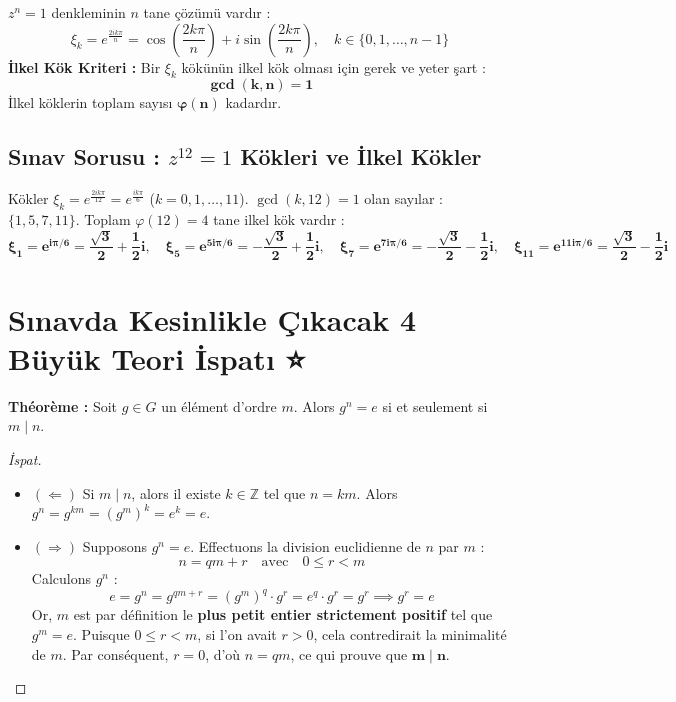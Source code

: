 \documentclass[11pt,a4paper]{article}
\begin{document}
\begin{tcolorbox}[colback=blue!5!white,colframe=blue!75!black,title=Birimin Kökleri ve İlkel Kök Şartı]
$z^n = 1$ denkleminin $n$ tane çözümü vardır :
\[ \xi_k = e^{\frac{2ik\pi}{n}} = \cos\left(\frac{2k\pi}{n}\right) + i \sin\left(\frac{2k\pi}{n}\right), \quad k \in \{0, 1, \dots, n-1\} \]
\textbf{İlkel Kök Kriteri :} Bir $\xi_k$ kökünün ilkel kök olması için gerek ve yeter şart :
\[ \mathbf{\gcd(k, n) = 1} \]
İlkel köklerin toplam sayısı $\mathbf{\varphi(n)}$ kadardır.
\end{tcolorbox}

\subsection*{Sınav Sorusu : $z^{12} = 1$ Kökleri ve İlkel Kökler}
Kökler $\xi_k = e^{\frac{2ik\pi}{12}} = e^{\frac{ik\pi}{6}}$ ($k = 0, 1, \dots, 11$).  
$\gcd(k, 12) = 1$ olan sayılar : $\{1, 5, 7, 11\}$.  
Toplam $\varphi(12) = 4$ tane ilkel kök vardır :
\[ \mathbf{\xi_1 = e^{i\pi/6} = \frac{\sqrt{3}}{2} + \frac{1}{2}i}, \quad 
\mathbf{\xi_5 = e^{5i\pi/6} = -\frac{\sqrt{3}}{2} + \frac{1}{2}i}, \quad 
\mathbf{\xi_7 = e^{7i\pi/6} = -\frac{\sqrt{3}}{2} - \frac{1}{2}i}, \quad 
\mathbf{\xi_{11} = e^{11i\pi/6} = \frac{\sqrt{3}}{2} - \frac{1}{2}i} \]

\vspace{0.5cm}

\section{Sınavda Kesinlikle Çıkacak 4 Büyük Teori İspatı ⭐}

\begin{tcolorbox}[colback=red!5!white,colframe=red!75!black,title=\textbf{İSPAT 1 : Bölünebilme Leması ($g^n = e \iff m \mid n$)}]
\textbf{Théorème :} Soit $g \in G$ un élément d'ordre $m$. Alors $g^n = e$ si et seulement si $m \mid n$.
\end{tcolorbox}
\begin{proof}[İspat]
\begin{itemize}
    \item $(\Longleftarrow)$ Si $m \mid n$, alors il existe $k \in \mathbb{Z}$ tel que $n = km$.  
    Alors $g^n = g^{km} = (g^m)^k = e^k = e$.
    \item $(\Longrightarrow)$ Supposons $g^n = e$. Effectuons la division euclidienne de $n$ par $m$ :
    \[ n = qm + r \quad \text{avec} \quad 0 \leq r < m \]
    Calculons $g^n$ :
    \[ e = g^n = g^{qm+r} = (g^m)^q \cdot g^r = e^q \cdot g^r = g^r \implies g^r = e \]
    Or, $m$ est par définition le \textbf{plus petit entier strictement positif} tel que $g^m = e$.  
    Puisque $0 \leq r < m$, si l'on avait $r > 0$, cela contredirait la minimalité de $m$.  
    Par conséquent, $r = 0$, d'où $n = qm$, ce qui prouve que $\mathbf{m \mid n}$.
\end{itemize}
\end{proof}
\end{document}
